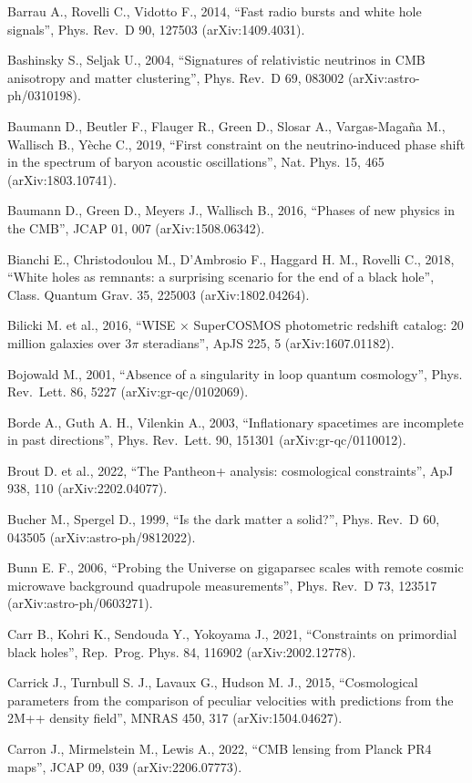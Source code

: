 \documentclass[
  11pt,
]{article}
\begin{document}
Barrau A., Rovelli C., Vidotto F., 2014, ``Fast radio bursts and white
hole signals'', Phys. Rev.~D 90, 127503 (arXiv:1409.4031).

Bashinsky S., Seljak U., 2004, ``Signatures of relativistic neutrinos in
CMB anisotropy and matter clustering'', Phys. Rev.~D 69, 083002
(arXiv:astro-ph/0310198).

Baumann D., Beutler F., Flauger R., Green D., Slosar A., Vargas-Magaña
M., Wallisch B., Yèche C., 2019, ``First constraint on the
neutrino-induced phase shift in the spectrum of baryon acoustic
oscillations'', Nat. Phys. 15, 465 (arXiv:1803.10741).

Baumann D., Green D., Meyers J., Wallisch B., 2016, ``Phases of new
physics in the CMB'', JCAP 01, 007 (arXiv:1508.06342).

Bianchi E., Christodoulou M., D'Ambrosio F., Haggard H. M., Rovelli C.,
2018, ``White holes as remnants: a surprising scenario for the end of a
black hole'', Class. Quantum Grav. 35, 225003 (arXiv:1802.04264).

Bilicki M. et al., 2016, ``WISE × SuperCOSMOS photometric redshift
catalog: 20 million galaxies over \(3\pi\) steradians'', ApJS 225, 5
(arXiv:1607.01182).

Bojowald M., 2001, ``Absence of a singularity in loop quantum
cosmology'', Phys. Rev.~Lett. 86, 5227 (arXiv:gr-qc/0102069).

Borde A., Guth A. H., Vilenkin A., 2003, ``Inflationary spacetimes are
incomplete in past directions'', Phys. Rev.~Lett. 90, 151301
(arXiv:gr-qc/0110012).

Brout D. et al., 2022, ``The Pantheon+ analysis: cosmological
constraints'', ApJ 938, 110 (arXiv:2202.04077).

Bucher M., Spergel D., 1999, ``Is the dark matter a solid?'', Phys.
Rev.~D 60, 043505 (arXiv:astro-ph/9812022).

Bunn E. F., 2006, ``Probing the Universe on gigaparsec scales with
remote cosmic microwave background quadrupole measurements'', Phys.
Rev.~D 73, 123517 (arXiv:astro-ph/0603271).

Carr B., Kohri K., Sendouda Y., Yokoyama J., 2021, ``Constraints on
primordial black holes'', Rep.~Prog. Phys. 84, 116902
(arXiv:2002.12778).

Carrick J., Turnbull S. J., Lavaux G., Hudson M. J., 2015,
``Cosmological parameters from the comparison of peculiar velocities
with predictions from the 2M++ density field'', MNRAS 450, 317
(arXiv:1504.04627).

Carron J., Mirmelstein M., Lewis A., 2022, ``CMB lensing from Planck PR4
maps'', JCAP 09, 039 (arXiv:2206.07773).
\end{document}
